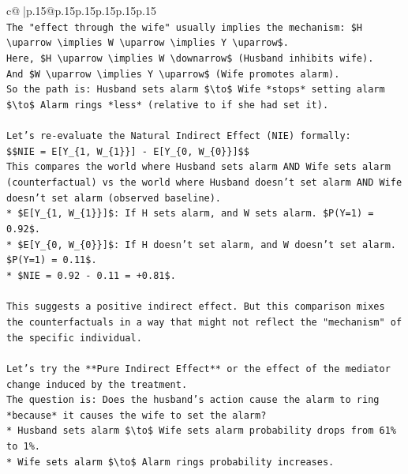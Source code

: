 \documentclass{article}
\begin{document}
{\begin{supertabular}{c@{$\;$}|p{.15\linewidth}@{}p{.15\linewidth}p{.15\linewidth}p{.15\linewidth}p{.15\linewidth}p{.15\linewidth}}
{{{\\ 
\texttt{The "effect through the wife" usually implies the mechanism: \$H \textbackslash{}uparrow \textbackslash{}implies W \textbackslash{}uparrow \textbackslash{}implies Y \textbackslash{}uparrow\$.} \\
\texttt{Here, \$H \textbackslash{}uparrow \textbackslash{}implies W \textbackslash{}downarrow\$ (Husband inhibits wife).} \\
\texttt{And \$W \textbackslash{}uparrow \textbackslash{}implies Y \textbackslash{}uparrow\$ (Wife promotes alarm).} \\
\texttt{So the path is: Husband sets alarm \$\textbackslash{}to\$ Wife *stops* setting alarm \$\textbackslash{}to\$ Alarm rings *less* (relative to if she had set it).} \\
\\ 
\texttt{Let's re{-}evaluate the Natural Indirect Effect (NIE) formally:} \\
\texttt{\$\$NIE = E{[}Y\_\{1, W\_\{1\}\}{]} {-} E{[}Y\_\{0, W\_\{0\}\}{]}\$\$} \\
\texttt{This compares the world where Husband sets alarm AND Wife sets alarm (counterfactual) vs the world where Husband doesn't set alarm AND Wife doesn't set alarm (observed baseline).} \\
\texttt{*   \$E{[}Y\_\{1, W\_\{1\}\}{]}\$: If H sets alarm, and W sets alarm. \$P(Y=1) = 0.92\$.} \\
\texttt{*   \$E{[}Y\_\{0, W\_\{0\}\}{]}\$: If H doesn't set alarm, and W doesn't set alarm. \$P(Y=1) = 0.11\$.} \\
\texttt{*   \$NIE = 0.92 {-} 0.11 = +0.81\$.} \\
\\ 
\texttt{This suggests a positive indirect effect. But this comparison mixes the counterfactuals in a way that might not reflect the "mechanism" of the specific individual.} \\
\\ 
\texttt{Let's try the **Pure Indirect Effect** or the effect of the mediator change induced by the treatment.} \\
\texttt{The question is: Does the husband's action cause the alarm to ring *because* it causes the wife to set the alarm?} \\
\texttt{*   Husband sets alarm \$\textbackslash{}to\$ Wife sets alarm probability drops from 61\% to 1\%.} \\
\texttt{*   Wife sets alarm \$\textbackslash{}to\$ Alarm rings probability increases.} \\
}}}
\end{supertabular}}
\end{document}
